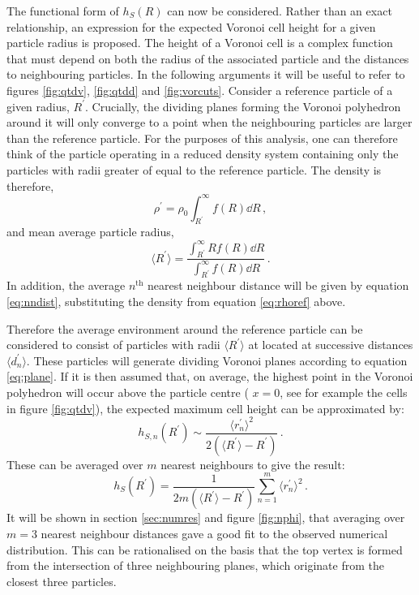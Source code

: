 The functional form of $h_S\left(R\right)$ can now be considered.
Rather than an exact relationship, an expression for the expected Voronoi cell height for a given particle radius is proposed.
The height of a Voronoi cell is a complex function that must depend on both the radius of the associated particle and the distances to neighbouring particles. 
In the following arguments it will be useful to refer to figures \ref{fig:qtdv}, \ref{fig:qtdd} and \ref{fig:vorcuts}.
Consider a reference particle of a given radius, $R^\prime$.
Crucially, the dividing planes forming the Voronoi polyhedron around it will only converge to a point when the neighbouring particles are larger than the reference particle.
For the purposes of this analysis, one can therefore think of the particle operating in a reduced density system containing only the particles with radii greater of equal to the reference particle.
The density is therefore,
\begin{equation}
	\label{eq:rhoref}
	\rho^\prime = \rho_0 \int_{R^\prime}^{\infty} f\left(R\right) \dd R\,,
\end{equation}
and mean average particle radius,
\begin{equation}
	\langle R^\prime \rangle = \frac{\int_{R^\prime}^{\infty} R f\left(R\right) \dd R }{\int_{R^\prime}^{\infty} f\left(R\right) \dd R}\,.
\end{equation}
In addition, the average $n^{\mathrm{th}}$ nearest neighbour distance will be given by equation \eqref{eq:nndist}, substituting the density from equation \eqref{eq:rhoref} above.

Therefore the average environment around the reference particle can be considered to consist of particles with radii $\langle R^\prime \rangle$ at located at successive distances $\langle d^\prime_n\rangle$.
These particles will generate dividing Voronoi planes according to equation \eqref{eq:plane}.
If it is then assumed that, on average, the highest point in the Voronoi polyhedron will occur above the particle centre (\ie{} $x=0$, see for example the cells in figure \ref{fig:qtdv}), the expected maximum cell height can be approximated by:
\begin{equation}
	h_{S,n}\left(R^\prime\right) \sim \frac{\langle r^\prime_n\rangle^2}{2\left(\langle R^\prime \rangle - R^\prime\right)}\,.
\end{equation}
These can be averaged over $m$ nearest neighbours to give the result:
\begin{equation}
	h_S\left(R^\prime\right) = \frac{1}{2m\left(\langle R^\prime\rangle-R^\prime\right)}\sum\limits_{n=1}^{m} \langle r^\prime_n \rangle^2\,.
\end{equation} 
It will be shown in section \ref{sec:numres} and figure \ref{fig:nphi}, that averaging over $m=3$ nearest neighbour distances gave a good fit to the observed numerical distribution.
This can be rationalised on the basis that the top vertex is formed from the intersection of three neighbouring planes, which originate from the closest three particles.

